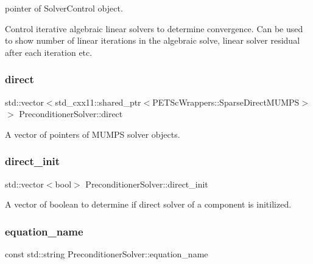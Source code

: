 pointer of Solver\+Control object. 

Control iterative algebraic linear solvers to determine convergence. Can be used to show number of linear iterations in the algebraic solve, linear solver residual after each iteration etc. \mbox{\label{class_preconditioner_solver_acd3bde261fb29c50e15ffe6ecd78ee5f}} 
\subsubsection{\texorpdfstring{direct}{direct}}
{\footnotesize\ttfamily std\+::vector$<$std\+\_\+cxx11\+::shared\+\_\+ptr$<$P\+E\+T\+Sc\+Wrappers\+::\+Sparse\+Direct\+M\+U\+M\+PS$>$ $>$ Preconditioner\+Solver\+::direct\hspace{0.3cm}{\ttfamily [private]}}



A vector of pointers of M\+U\+M\+PS solver objects. 

\mbox{\label{class_preconditioner_solver_a0241f0b26a8c964fc1e3fd8fef5a20a6}} 
\subsubsection{\texorpdfstring{direct\+\_\+init}{direct\_init}}
{\footnotesize\ttfamily std\+::vector$<$bool$>$ Preconditioner\+Solver\+::direct\+\_\+init\hspace{0.3cm}{\ttfamily [private]}}



A vector of boolean to determine if direct solver of a component is initilized. 

\mbox{\label{class_preconditioner_solver_af20758bf54111e7092c49688622b1e54}} 
\subsubsection{\texorpdfstring{equation\+\_\+name}{equation\_name}}
{\footnotesize\ttfamily const std\+::string Preconditioner\+Solver\+::equation\+\_\+name\hspace{0.3cm}{\ttfamily [private]}}



